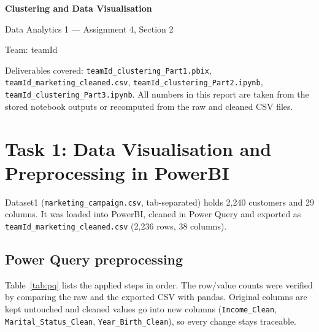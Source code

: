 \documentclass[11pt]{article}
\begin{document}
\begin{titlepage}
\centering\vspace*{4cm}
{\LARGE\bfseries Clustering and Data Visualisation\par}\vspace{0.6cm}
{\large Data Analytics 1 --- Assignment 4, Section 2\par}\vspace{0.4cm}
{\large Team: teamId\par}\vspace{1.5cm}
\begin{minipage}{0.8\textwidth}\small\raggedright
Deliverables covered: \texttt{teamId\_clustering\_Part1.pbix}, \texttt{teamId\_marketing\_cleaned.csv},
\texttt{teamId\_clustering\_Part2.ipynb}, \texttt{teamId\_clustering\_Part3.ipynb}.
All numbers in this report are taken from the stored notebook outputs or recomputed from the
raw and cleaned CSV files.
\end{minipage}
\end{titlepage}
\tableofcontents
\newpage

\section{Task 1: Data Visualisation and Preprocessing in PowerBI}
Dataset1 (\texttt{marketing\_campaign.csv}, tab-separated) holds 2{,}240 customers and 29 columns.
It was loaded into PowerBI, cleaned in Power Query and exported as
\texttt{teamId\_marketing\_cleaned.csv} (2{,}236 rows, 38 columns).

\subsection{Power Query preprocessing}
Table~\ref{tab:pq} lists the applied steps in order. The row/value counts were verified by
comparing the raw and the exported CSV with pandas.
Original columns are kept untouched and cleaned values go into new columns
(\texttt{Income\_Clean}, \texttt{Marital\_Status\_Clean}, \texttt{Year\_Birth\_Clean}), so every
change stays traceable.
\end{document}
